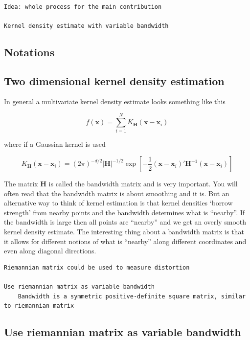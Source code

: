 \documentclass[11pt,a4paper,]{article}
\begin{document}
\begin{verbatim}
Idea: whole process for the main contribution

Kernel density estimate with variable bandwidth
\end{verbatim}

\hypertarget{notations}{%
\subsection{Notations}\label{notations}}

\hypertarget{two-dimensional-kernel-density-estimation}{%
\subsection{Two dimensional kernel density estimation}\label{two-dimensional-kernel-density-estimation}}

In general a multivariate kernel density estimate looks something like this

\[
\hat{f}(\mathbf{x})=\sum\limits_{i=1}^N K_{\mathbf{H}}(\mathbf{x}-\mathbf{x}_i)
\]

where if a Gaussian kernel is used

\[
K_{\mathbf{H}}(\mathbf{x}-\mathbf{x}_i)=(2\pi)^{-d/2}|\mathbf{H}|^{-1/2}\exp\left[-\frac{1}{2}(\mathbf{x}-\mathbf{x}_i)'\mathbf{H}^{-1}(\mathbf{x}-\mathbf{x}_i)\right]
\]

The matrix \(\mathbf{H}\) is called the bandwidth matrix and is very important. You will often read that the bandwidth matrix is about smoothing and it is. But an alternative way to think of kernel estimation is that kernel densities `borrow strength' from nearby points and the bandwidth determines what is ``nearby''. If the bandwidth is large then all points are ``nearby'' and we get an overly smooth kernel density estimate. The interesting thing about a bandwidth matrix is that it allows for different notions of what is ``nearby'' along different coordinates and even along diagonal directions.

\begin{verbatim}
Riemannian matrix could be used to measure distortion

Use riemannian matrix as variable bandwidth
    Bandwidth is a symmetric positive-definite square matrix, similar to riemannian matrix
\end{verbatim}

\hypertarget{use-riemannian-matrix-as-variable-bandwidth}{%
\subsection{Use riemannian matrix as variable bandwidth}\label{use-riemannian-matrix-as-variable-bandwidth}}
\end{document}
